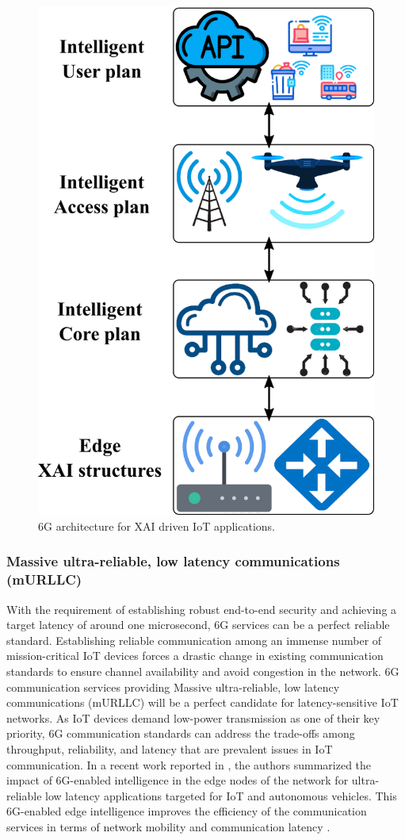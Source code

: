 \documentclass[journal]{IEEEtran}
\begin{document}
\begin{figure}[t]
  \centering    
  \includegraphics[width=0.85\linewidth]{figures/6GXAI.png}
  \caption{6G architecture for XAI driven IoT applications.}
     \label{fig:6GXAI}
\end{figure}

\subsubsection{Massive ultra-reliable, low latency communications (mURLLC)} 
With the requirement of establishing robust end-to-end security and achieving a target latency of around one microsecond, 6G services can be a perfect reliable standard. Establishing reliable communication among an immense number of mission-critical IoT devices forces a drastic change in existing communication standards to ensure channel availability and avoid congestion in the network. 6G communication services providing Massive ultra-reliable, low latency communications (mURLLC) will be a perfect candidate for latency-sensitive IoT networks. As IoT devices demand low-power transmission as one of their key priority, 6G communication standards can address the trade-offs among throughput, reliability, and latency that are prevalent issues in IoT communication. In a recent work reported in \cite{gupta20216g}, the authors summarized the impact of 6G-enabled intelligence in the edge nodes of the network for ultra-reliable low latency applications targeted for IoT and autonomous vehicles. This 6G-enabled edge intelligence improves the efficiency of the communication services in terms of network mobility and communication latency \cite{guo2021enabling,gupta20216g}. 
\end{document}
